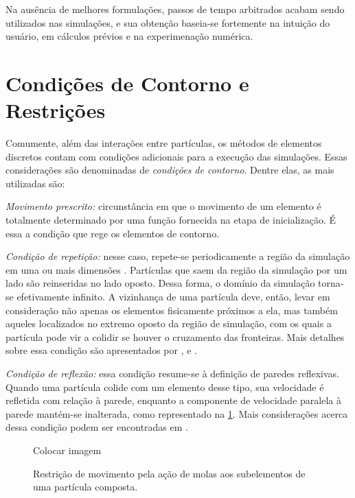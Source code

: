 Na ausência de melhores formulações, passos de tempo arbitrados acabam sendo utilizados nas simulações, e sua obtenção baseia-se fortemente na intuição do usuário, em cálculos prévios e na experimenação numérica.

\section{Condições de Contorno e Restrições} \label{sec:boundary_condition}

Comumente, além das interações entre partículas, os métodos de elementos discretos contam com condições adicionais para a execução das simulações. Essas considerações são denominadas de \textit{condições de contorno}. Dentre elas, as mais utilizadas são:
\begin{alineas}
\item \textit{Movimento prescrito:} circunstância em que o movimento de um elemento é totalmente determinado por uma função fornecida na etapa de inicialização. É essa a condição que rege os elementos de contorno.
\item \textit{Condição de repetição:} nesse caso, repete-se periodicamente a região da simulação em uma ou mais dimensões \cite[p. 15]{bib:computational_granular_dynamics}. Partículas que saem da região da simulação por um lado são reinseridas no lado oposto. Dessa forma, o domínio da simulação torna-se efetivamente infinito. A vizinhança de uma partícula deve, então, levar em consideração não apenas os elementos fisicamente próximos a ela, mas também aqueles localizados no extremo oposto da região de simulação, com os quais a partícula pode vir a colidir se houver o cruzamento das fronteiras. Mais detalhes sobre essa condição são apresentados por ,  e .
\item \textit{Condição de reflexão:} essa condição resume-se à definição de paredes reflexivas. Quando uma partícula colide com um elemento desse tipo, sua velocidade é refletida com relação à parede, enquanto a componente de velocidade paralela à parede mantém-se inalterada, como representado na \cref{fig:boundary_conditions:reflecting_boundary}. Mais considerações acerca dessa condição podem ser encontradas em .

\begin{figure}[h]
	\caption{Restrição de movimento pela ação de molas aos subelementos de uma partícula composta.}
	\centering
		\alert{Colocar imagem}
	\label{fig:boundary_conditions:reflecting_boundary}
\end{figure}


\end{alineas}
